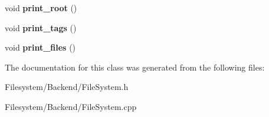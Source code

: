 \begin{DoxyCompactItemize}
\item 
\mbox{\label{classFileSystem_a8ec00d561e8d7510358618b249cc60d1}} 
void {\bfseries print\+\_\+root} ()
\item 
\mbox{\label{classFileSystem_ab76af13f044c3ca52e8503a9695685bd}} 
void {\bfseries print\+\_\+tags} ()
\item 
\mbox{\label{classFileSystem_a8d51e4c73c71d91d94ae91355f36bdb1}} 
void {\bfseries print\+\_\+files} ()
\end{DoxyCompactItemize}


The documentation for this class was generated from the following files\+:\begin{DoxyCompactItemize}
\item 
Filesystem/\+Backend/File\+System.\+h\item 
Filesystem/\+Backend/File\+System.\+cpp\end{DoxyCompactItemize}
